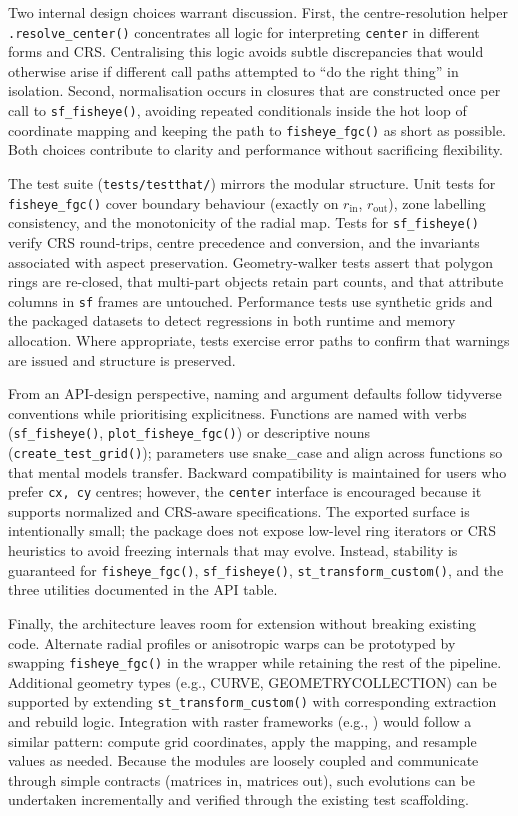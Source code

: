 Two internal design choices warrant discussion. First, the centre-resolution helper
\texttt{.resolve\_center()} concentrates all logic for interpreting \texttt{center} in different forms and
CRS. Centralising this logic avoids subtle discrepancies that would otherwise arise if different call
paths attempted to ``do the right thing'' in isolation. Second, normalisation occurs in closures that
are constructed once per call to \texttt{sf\_fisheye()}, avoiding repeated conditionals inside the hot
loop of coordinate mapping and keeping the path to \texttt{fisheye\_fgc()} as short as possible. Both
choices contribute to clarity and performance without sacrificing flexibility.

The test suite (\texttt{tests/testthat/}) mirrors the modular structure. Unit tests for
\texttt{fisheye\_fgc()} cover boundary behaviour (exactly on \(r_{\text{in}}\), \(r_{\text{out}}\)), zone
labelling consistency, and the monotonicity of the radial map. Tests for \texttt{sf\_fisheye()} verify
CRS round-trips, centre precedence and conversion, and the invariants associated with aspect
preservation. Geometry-walker tests assert that polygon rings are re-closed, that multi-part objects
retain part counts, and that attribute columns in \texttt{sf} frames are untouched. Performance tests
use synthetic grids and the packaged datasets to detect regressions in both runtime and memory
allocation. Where appropriate, tests exercise error paths to confirm that warnings are issued and
structure is preserved.

From an API-design perspective, naming and argument defaults follow tidyverse conventions while
prioritising explicitness. Functions are named with verbs (\texttt{sf\_fisheye()}, \texttt{plot\_fisheye\_fgc()})
or descriptive nouns (\texttt{create\_test\_grid()}); parameters use snake\_case and align across
functions so that mental models transfer. Backward compatibility is maintained for users who prefer
\texttt{cx,\ cy} centres; however, the \texttt{center} interface is encouraged because it supports
normalized and CRS-aware specifications. The exported surface is intentionally small; the package
does not expose low-level ring iterators or CRS heuristics to avoid freezing internals that may
evolve. Instead, stability is guaranteed for \texttt{fisheye\_fgc()}, \texttt{sf\_fisheye()},
\texttt{st\_transform\_custom()}, and the three utilities documented in the API table.

Finally, the architecture leaves room for extension without breaking existing code. Alternate radial
profiles or anisotropic warps can be prototyped by swapping \texttt{fisheye\_fgc()} in the wrapper while
retaining the rest of the pipeline. Additional geometry types (e.g., CURVE, GEOMETRYCOLLECTION) can
be supported by extending \texttt{st\_transform\_custom()} with corresponding extraction and rebuild
logic. Integration with raster frameworks (e.g., ) would follow a similar pattern: compute
grid coordinates, apply the mapping, and resample values as needed. Because the modules are loosely
coupled and communicate through simple contracts (matrices in, matrices out), such evolutions can be
undertaken incrementally and verified through the existing test scaffolding.

